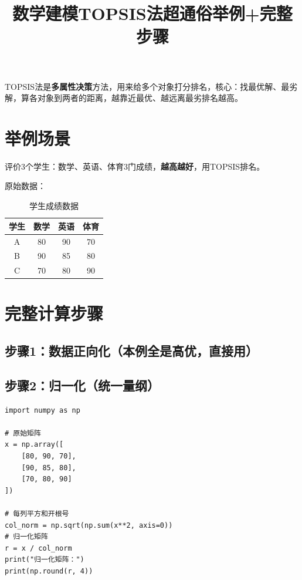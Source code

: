 \documentclass{article}
\begin{document}
\title{数学建模TOPSIS法超通俗举例+完整步骤}
\author{}
\date{}
\maketitle

TOPSIS法是\textbf{多属性决策}方法，用来给多个对象打分排名，核心：找最优解、最劣解，算各对象到两者的距离，越靠近最优、越远离最劣排名越高。

\section{举例场景}
评价3个学生：数学、英语、体育3门成绩，\textbf{越高越好}，用TOPSIS排名。

原始数据：

\begin{table}[htbp]
    \centering
    \begin{tabular}{cccc}
        \toprule
        学生 & 数学 & 英语 & 体育 \\
        \midrule
        A & 80 & 90 & 70 \\
        B & 90 & 85 & 80 \\
        C & 70 & 80 & 90 \\
        \bottomrule
    \end{tabular}
    \caption{学生成绩数据}
    \label{tab:student_scores}
\end{table}

\section{完整计算步骤}

\subsection{步骤1：数据正向化（本例全是高优，直接用）}

\subsection{步骤2：归一化（统一量纲）}

\begin{lstlisting}
import numpy as np

# 原始矩阵
x = np.array([
    [80, 90, 70],
    [90, 85, 80],
    [70, 80, 90]
])

# 每列平方和开根号
col_norm = np.sqrt(np.sum(x**2, axis=0))
# 归一化矩阵
r = x / col_norm
print("归一化矩阵：")
print(np.round(r, 4))
\end{lstlisting}
\end{document}
